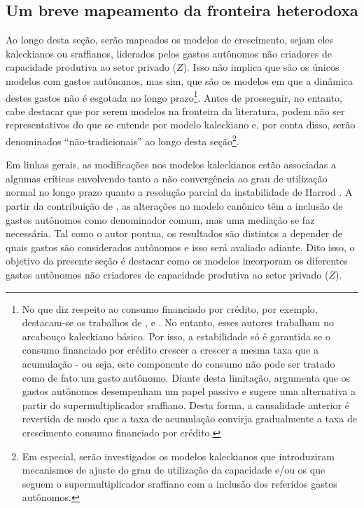\subsection{Um breve mapeamento da fronteira heterodoxa}
\label{Hibridos}
Ao longo desta seção, serão mapeados os modelos de crescimento, 
sejam eles kaleckianos ou sraffianos, liderados pelos gastos autônomos não criadores de capacidade produtiva ao setor privado ($Z$). Isso não implica que são os únicos modelos com gastos autônomos, mas sim, que são os modelos em que a dinâmica destes gastos não é esgotada no longo prazo\footnote{
	No que diz respeito ao consumo financiado por crédito, por exemplo, destacam-se os trabalhos de \textcite{dutt_maturity_2006}, \textcite{palley_inside_2010} e \textcite{hein_finance-dominated_2012}.
	No entanto, esses autores trabalham no arcabouço kaleckiano básico. Por isso, a estabilidade só é garantida se o consumo financiado por crédito crescer a crescer a mesma taxa que a acumulação - ou seja, este componente do consumo não pode ser tratado como de fato um gasto autônomo.
	Diante desta limitação, \textcite{pariboni_household_2016} argumenta que os gastos autônomos desempenham um papel passivo e sugere uma alternativa a partir do supermultiplicador sraffiano. Desta forma, a causalidade anterior é revertida de modo que a taxa de acumulação convirja gradualmente a taxa de crescimento consumo financiado por crédito.
}.
Antes de prosseguir, no entanto, cabe destacar que por serem modelos na fronteira da literatura, podem não ser representativos do que se entende por modelo kaleckiano e, por conta disso, serão denominados ``não-tradicionais'' ao longo desta seção\footnote{Em especial,  serão investigados os modelos kaleckianos que introduziram mecanismos de ajuste do grau de utilização da capacidade e/ou os que seguem o supermultiplicador sraffiano com a inclusão dos referidos gastos autônomos.}.


Em linhas gerais, as modificações nos modelos kaleckianos estão associadas a algumas críticas envolvendo tanto a não convergência ao grau de utilização normal no longo prazo quanto a resolução parcial da instabilidade de Harrod \cites{dallery_kaleckian_2007}{skott_theoretical_2012}{hein_harrodian_2012}.
A partir da contribuição de \textcite{allain_tackling_2015}, as alterações no modelo canônico têm a inclusão de gastos autônomos como denominador comum, mas uma mediação se faz necessária. 
Tal como o autor pontua, os resultados são distintos a depender de quais gastos são considerados autônomos e isso será avaliado adiante. 
Dito isso, o objetivo da presente seção é destacar como os modelos incorporam os diferentes gastos autônomos não criadores de capacidade produtiva ao setor privado ($Z$). 

